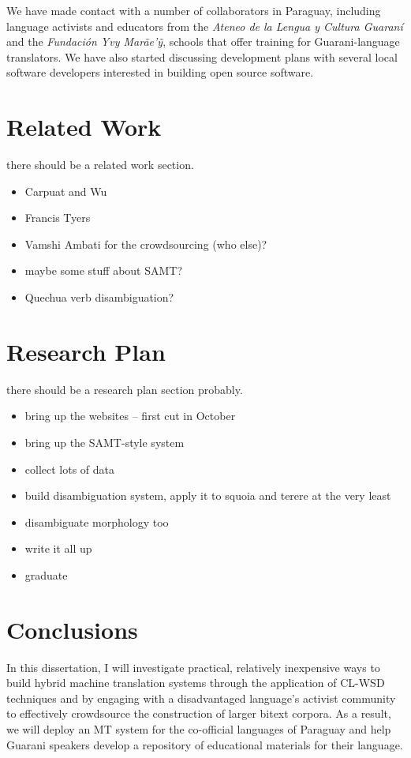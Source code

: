\documentclass{article}
\begin{document}
We have made contact with a number of collaborators in Paraguay, including
language activists and educators from the \emph{Ateneo de la Lengua y Cultura
Guaraní} and the \emph{Fundación Yvy Marãe'{\~y}}, schools that offer training
for Guarani-language translators. We have also started discussing development
plans with several local software developers interested in building open source
software.

\section{Related Work}
there should be a related work section.

\begin{itemize}
  \item Carpuat and Wu
  \item Francis Tyers
  \item Vamshi Ambati for the crowdsourcing (who else)?
  \item maybe some stuff about SAMT?
  \item Quechua verb disambiguation?
\end{itemize}

\section{Research Plan}
there should be a research plan section probably.

\begin{itemize}
  \item bring up the websites -- first cut in October
  \item bring up the SAMT-style system
  \item collect lots of data
  \item build disambiguation system, apply it to squoia and terere at the very least
  \item disambiguate morphology too
  \item write it all up
  \item graduate
\end{itemize}

\section{Conclusions}
In this dissertation, I will investigate practical, relatively inexpensive ways
to build hybrid machine translation systems through the application of CL-WSD
techniques and by engaging with a disadvantaged language's activist community
to effectively crowdsource the construction of larger bitext corpora. As a
result, we will deploy an MT system for the co-official languages of Paraguay
and help Guarani speakers develop a repository of educational materials for
their language.
\end{document}
